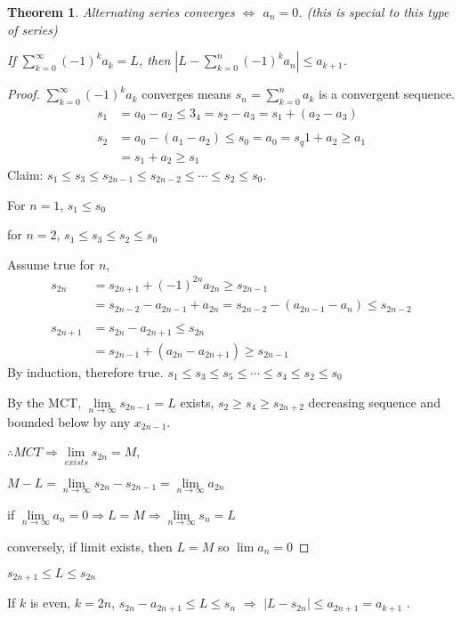 \documentclass[12pt]{article}
\newcommand{\abs}[1]{\left| #1 \right|}
\theoremstyle{plain}
\newtheorem{theorem}{Theorem}[subsection]
\newcommand{\dlim}{\displaystyle\lim\limits}
\begin{document}
	\begin{theorem}
		Alternating series converges $\iff$ $a_n = 0$. (this is special to this
		type of series)

			If $\sum_{k=0}^{\infty} (-1)^k a_k = L$,
			then $\abs{L-\sum_{k=0}^n (-1)^ka_n} \leq a_{k+1}$.
	\end{theorem}
	\begin{proof}
		$\sum_{k=0}^{\infty} (-1)^ka_k$ converges means $s_n = \sum_{k=0}^n a_k$
		is a convergent sequence.
		\begin{align*}
			s_1 &= a_0-a_2\leq 3_4=s_2-a_3=s_1+(a_2-a_3)\\\\
			s_2&=a_0-(a_1-a_2)\leq s_0=a_0=s_q1+a_2\geq a_1\\
			&=s_1+a_2\geq s_1
		\end{align*}
		Claim: $s_1\leq s_3\leq s_{2n-1}\leq s_{2n-2}\leq\cdots\leq s_2\leq s_0$.

		For $n=1$, $s_1\leq s_0$

		for $n=2$, $s_1\leq s_3\leq s_2\leq s_0$

		Assume true for $n$, 
		\begin{align*}
			s_{2n}&=s_{2n+1}+(-1)^{2n}a_{2n}\geq s_{2n-1}\\
						&=s_{2n-2}-a_{2n-1}+a_{2n}
						 =s_{2n-2}-(a_{2n-1}-a_n)\leq s_{2n-2}\\\\
			s_{2n+1}&=s_{2n}-a_{2n+1}\leq s_{2n}\\
							&=s_{2n-1}+(a_{2n}-a_{2n+1})\geq s_{2n-1}
		\end{align*}
		By induction, therefore true. 
		$s_1\leq s_3\leq s_5\leq \cdots \leq s_4\leq s_2\leq s_0$

	By the MCT, $\dlim_{n\to\infty} s_{2n-1}=L$ exists, 
	$s_2\geq s_4\geq s_{2n+2}$ decreasing sequence and bounded below by any
	$x_{2n-1}$.

	$\therefore MCT  \Rightarrow \dlim_{exists} s_{2n}=M$, 

	$M-L = \dlim_{n\to \infty} s_{2n}-s_{2n-1} = \dlim_{n\to\infty} a_{2n}$ 

	if $\dlim_{n\to\infty} a_n=0 \Rightarrow L=M \Rightarrow \dlim_{n\to\infty}
	s_n=L$ 

	conversely, if limit exists, then $L=M$ so $\dlim a_n = 0$
\end{proof}

$s_{2n+1}\leq L\leq s_{2n}$

If $k$ is even, $k=2n$, $s_{2n}-a_{2n+1} \leq L \leq s_n$ $\Rightarrow$
$\abs{L-s_{2n}}\leq a_{2n+1}=a_{k+1}$ .
\end{document}
